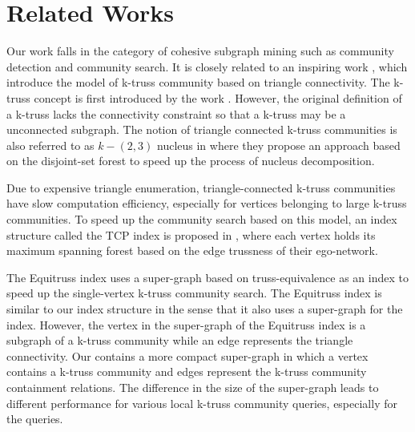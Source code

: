 \section{Related Works}
\label{relatedwork} 

Our work falls in the category of cohesive subgraph mining \cite{sozio2010community,cui2014local,bera2018maximal} such as community detection and community search. It is closely related to an inspiring work \cite{huang2014querying}, which introduce the model of k-truss community based on triangle connectivity. 
The k-truss concept is first introduced by the work \cite{cohen2008trusses}. However, the original definition of a k-truss lacks the connectivity constraint so that a k-truss may be a unconnected subgraph. 
The notion of triangle connected k-truss communities is also referred to as $k-(2,3)$ nucleus in \cite{sariyuce2017nucleus} where they propose an approach based on the disjoint-set forest to speed up the process of nucleus decomposition. 

Due to expensive triangle enumeration, triangle-connected k-truss communities have slow computation efficiency, especially for vertices belonging to large k-truss communities. To speed up the community search based on this model, an index structure called the TCP index is proposed in \cite{huang2014querying}, where each vertex holds its maximum spanning forest based on the edge trussness of their ego-network. 

The Equitruss index \cite{akbas2017truss} uses a super-graph based on truss-equivalence as an index to speed up the single-vertex k-truss community search.  
The Equitruss index is similar to our index structure in the sense that it also uses a super-graph for the index. However, the vertex in the super-graph of the Equitruss index is a subgraph of a k-truss community while an edge represents the triangle connectivity. Our \twolevelindex{} contains a more compact super-graph in which a vertex contains a k-truss community and edges represent the k-truss community containment relations.    The difference in the size of the super-graph leads to different performance for various local k-truss community queries, especially for the \toplevelprob{} queries. 

